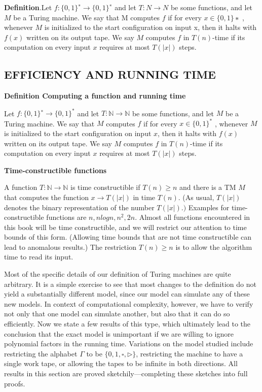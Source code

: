 \documentclass[a4paper]{article}
\begin{document}
\textbf{Definition}.Let $f : \{0, 1\}^∗ → \{0, 1\}^∗$ and let $T : N → N$ be some functions, and let $M$ be a Turing
machine. We say that M computes $f$ if for every $x ∈ \{0, 1\}∗$ , whenever $M$ is initialized
to the start configuration on input x, then it halts with $f(x)$ written on its output tape.
We say $M$ computes $f$ in $T(n)$-time if its computation on every input $x$ requires at
most $T(|x|)$ steps.

\subsection{EFFICIENCY AND RUNNING TIME}

\textbf{Definition Computing a function and running time}

Let $f : \{0, 1\}^{∗} \rightarrow \{0, 1\}^{*}$ and let $T :  \mathbb{N} →  \mathbb{N}$ be some functions, and let $M$ be a Turing
machine. We say that $M$ computes $f$ if for every $x \in \{0, 1\}^{*}$ , whenever $M$ is initialized
to the start configuration on input $x$, then it halts with $f(x)$ written on its output tape.
We say $M$ computes $f$ in $T(n)$-time if its computation on every input $x$ requires at most $T(|x|)$ steps.

\textbf{Time-constructible functions}

A function $T : \mathbb{N} \rightarrow \mathbb{N}$ is time constructible if $T(n) \geq n$ and there is a TM $M$ that
computes the function $x  \rightarrow  T(|x|)$  in time $T(n)$. (As usual,  $T(|x|)$  denotes the binary
representation of the number $T(|x|).)$ Examples for time-constructible functions are $n, nlogn, n^2 , 2n $. Almost all functions encountered in this book will be time constructible,
and we will restrict our attention to time bounds of this form. (Allowing time bounds
that are not time constructible can lead to anomalous results.) The restriction $T(n) \geq n$
is to allow the algorithm time to read its input.

Most of the specific details of our definition of Turing machines are quite arbitrary. It is
a simple exercise to see that most changes to the definition do not yield a substantially
different model, since our model can simulate any of these new models. In context of
computational complexity, however, we have to verify not only that one model can
simulate another, but also that it can do so efficiently. Now we state a few results of this
type, which ultimately lead to the conclusion that the exact model is unimportant if we
are willing to ignore polynomial factors in the running time. Variations on the model
studied include restricting the alphabet $\Gamma$ to be $\{0, 1, \square, \rhd \}$, restricting the machine to
have a single work tape, or allowing the tapes to be infinite in both directions. All results
in this section are proved sketchily—completing these sketches into full proofs.
\end{document}
